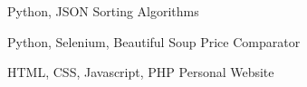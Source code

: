 


\begin{cventries}

      \cventry
        {Python, JSON} %
        {Sorting Algorithms} %
        {} %
        {} %
        {
          \begin{cvitems} %
            \item {}
          \end{cvitems}
        }

    \cventry
        {Python, Selenium, Beautiful Soup} %
        {Price Comparator} %
        {} %
        {} %
        {
        \begin{cvitems} %
            \item {}
        \end{cvitems}
        }

    \cventry
        {HTML, CSS, Javascript, PHP} %
        {Personal Website} %
        {} %
        {} %
        {
            \begin{cvitems} %
            \item {}
            \end{cvitems}
        }

    \end{cventries}
    